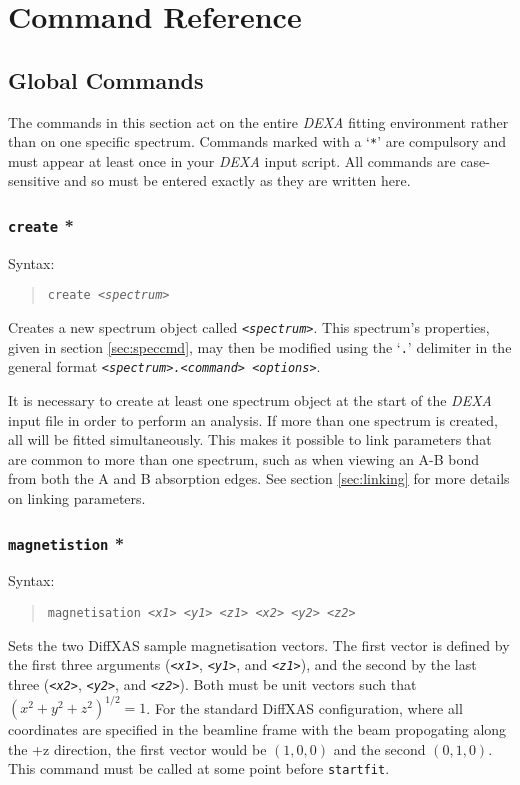 \documentclass[a4paper,12pt]{report}
\newcommand{\dexa}{\emph{DEXA} }
\begin{document}
\chapter{Command Reference}
\label{chapter:commandref}
\section{Global Commands}
The commands in this section act on the entire \dexa fitting environment rather than on one specific spectrum. Commands marked with a `\verb|*|' are compulsory and must appear at least once in your \dexa input script. All commands are case-sensitive and so must be entered exactly as they are written here.
\subsection{\texttt{create} *}
Syntax:
\begin{quote}
\texttt{create \emph{<spectrum>}}
\end{quote}
Creates a new spectrum object called \emph{\texttt{<spectrum>}}. This spectrum's properties, given in section \ref{sec:speccmd}, may then be modified using the `\verb|.|' delimiter in the general format \texttt{\emph{<spectrum>.<command> <options>}}.

It is necessary to create at least one spectrum object at the start of the \dexa input file in order to perform an analysis. If more than one spectrum is created, all will be fitted simultaneously. This makes it possible to link parameters that are common to more than one spectrum, such as when viewing an A-B bond from both the A and B absorption edges. See section \ref{sec:linking} for more details on linking parameters.

\subsection{\texttt{magnetistion} *}
Syntax:
\begin{quote}
  \texttt{magnetisation \emph{<x1> <y1> <z1> <x2> <y2> <z2>}}
\end{quote}
Sets the two DiffXAS sample magnetisation vectors. The first vector is defined by the first three arguments (\emph{\texttt{<x1>}}, \emph{\texttt{<y1>}}, and \emph{\texttt{<z1>}}), and the second by the last three (\emph{\texttt{<x2>}}, \emph{\texttt{<y2>}}, and \emph{\texttt{<z2>}}). Both must be unit vectors such that $(x^2 + y^2 + z^2)^{1/2} = 1$. For the standard DiffXAS configuration, where all coordinates are specified in the beamline frame with the beam propogating along the +z direction, the first vector would be $(1, 0, 0)$ and the second $(0, 1, 0)$. This command must be called at some point before \verb|startfit|.
\end{document}
